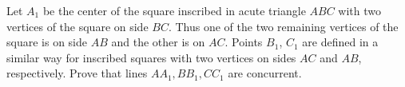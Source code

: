 Let $A_1$ be the center of the square inscribed in acute triangle $ABC$ with two vertices of the square on side $BC$. Thus one of the two remaining vertices of the square is on side $AB$ and the other is on $AC$. Points $B_1$, $C_1$ are defined in a similar way for inscribed squares with two vertices on sides $AC$ and $AB$, respectively. Prove that lines $AA_1, BB_1, CC_1$ are concurrent.
